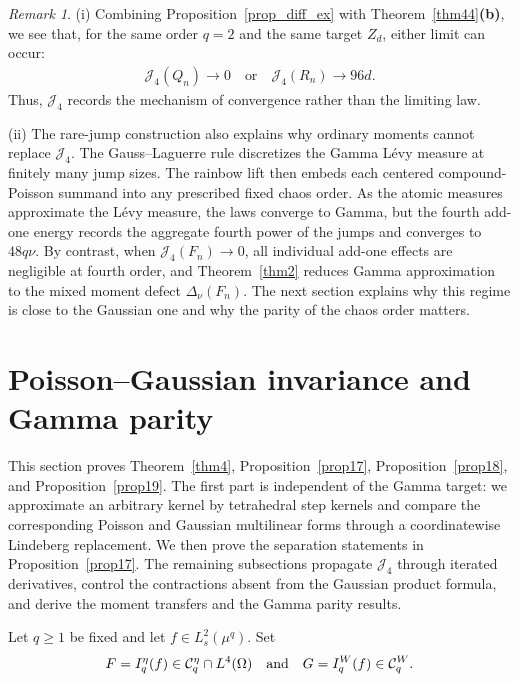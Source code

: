 \documentclass[letterpaper,11pt,reqno]{amsart}
\numberwithin{equation}{section}
\theoremstyle{plain}
\theoremstyle{definition}
\theoremstyle{remark}
\newtheorem{remark}[theorem]{Remark}
\newcommand{\cC}{\mathcal{C}}
\newcommand{\noi}{\noindent}
\newcommand{\Jfour}{\mathcal J_4}
\newcommand{\Del}{\Delta}
\newcommand{\AND}{\quad{\rm and}\quad}
\begin{document}
\begin{remark}\rm \label{rem_J4}
(i)
Combining Proposition~\ref{prop_diff_ex} with
Theorem~\ref{thm44}{\bf(b)}, we see that, for the same order $q=2$ and the
same target $Z_d$, either limit can occur:
\noi
\begin{align*}
 \Jfour(Q_n)\longrightarrow0
 \quad\text{or}\quad
 \Jfour(R_n)\longrightarrow96d.
\end{align*}
Thus, $\Jfour$ records the mechanism of convergence rather than the
limiting law.


(ii) The rare-jump construction also explains why ordinary moments cannot
replace $\Jfour$.  The Gauss--Laguerre rule discretizes the Gamma L\'evy
measure at finitely many jump sizes.  The rainbow lift then embeds each
centered compound-Poisson summand into any prescribed fixed chaos
order.
As the atomic measures approximate the L\'evy measure, the laws
converge to Gamma, but the fourth add-one energy records the aggregate
fourth power of the jumps and converges to $48q\nu$.
By contrast, when $\Jfour(F_n)\to0$, all individual add-one effects
are negligible at fourth order, and Theorem~\ref{thm2}
reduces Gamma approximation to the mixed moment defect
$\Del_\nu(F_n)$.  The next section explains why this regime is
close to the Gaussian one and why the parity of the chaos order
matters.
\end{remark}


\section{Poisson--Gaussian invariance and Gamma parity}
\label{SEC5}

This section proves Theorem~\ref{thm4},
Proposition~\ref{prop17}, Proposition~\ref{prop18}, and
Proposition~\ref{prop19}.  The first part is independent of the Gamma
target: we approximate an arbitrary kernel by tetrahedral step kernels
and compare the corresponding Poisson and Gaussian multilinear forms
through a coordinatewise Lindeberg replacement.  We then prove the
separation statements in Proposition~\ref{prop17}.  The remaining
subsections propagate $\Jfour$ through iterated derivatives, control
the contractions absent from the Gaussian product formula, and derive
the moment transfers and the Gamma parity results.

Let $q\geq1$ be fixed and let $f\in L_s^2(\mu^q)$.  Set
\noi
\begin{align}\label{FG_1}
 F=I_q^\eta(f)\in\cC_q^\eta\cap L^4(\Omega)
 \AND
 G=I_q^W(f)\in\cC_q^W.
\end{align}
\end{document}
